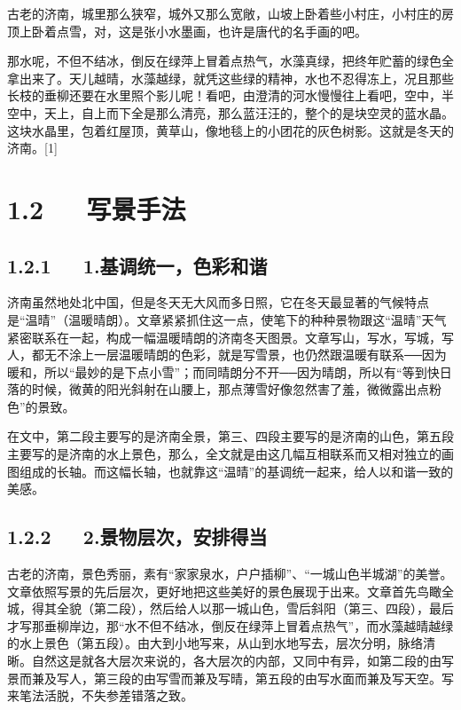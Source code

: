\documentclass[letterpaper,12pt,english]{sphinxmanual}
\begin{document}
古老的济南，城里那么狭窄，城外又那么宽敞，山坡上卧着些小村庄，小村庄的房顶上卧着点雪，对，这是张小水墨画，也许是唐代的名手画的吧。

那水呢，不但不结冰，倒反在绿萍上冒着点热气，水藻真绿，把终年贮蓄的绿色全拿出来了。天儿越晴，水藻越绿，就凭这些绿的精神，水也不忍得冻上，况且那些长枝的垂柳还要在水里照个影儿呢！看吧，由澄清的河水慢慢往上看吧，空中，半空中，天上，自上而下全是那么清亮，那么蓝汪汪的，整个的是块空灵的蓝水晶。这块水晶里，包着红屋顶，黄草山，像地毯上的小团花的灰色树影。这就是冬天的济南。{[}1{]}


\section{1.2   写景手法}
\label{\detokenize{p01_u6563_u6587/_u8001_u820d-_u6d4e_u5357_u7684_u51ac_u5929:id4}}

\subsection{1.2.1   1.基调统一，色彩和谐}
\label{\detokenize{p01_u6563_u6587/_u8001_u820d-_u6d4e_u5357_u7684_u51ac_u5929:id5}}
济南虽然地处北中国，但是冬天无大风而多日照，它在冬天最显著的气候特点是“温晴”（温暖晴朗）。文章紧紧抓住这一点，使笔下的种种景物跟这“温晴”天气紧密联系在一起，构成一幅温暖晴朗的济南冬天图景。文章写山，写水，写城，写人，都无不涂上一层温暖晴朗的色彩，就是写雪景，也仍然跟温暖有联系──因为暖和，所以“最妙的是下点小雪”；而同晴朗分不开──因为晴朗，所以有“等到快日落的时候，微黄的阳光斜射在山腰上，那点薄雪好像忽然害了羞，微微露出点粉色”的景致。

在文中，第二段主要写的是济南全景，第三、四段主要写的是济南的山色，第五段主要写的是济南的水上景色，那么，全文就是由这几幅互相联系而又相对独立的画图组成的长轴。而这幅长轴，也就靠这“温晴”的基调统一起来，给人以和谐一致的美感。


\subsection{1.2.2   2.景物层次，安排得当}
\label{\detokenize{p01_u6563_u6587/_u8001_u820d-_u6d4e_u5357_u7684_u51ac_u5929:id6}}
古老的济南，景色秀丽，素有“家家泉水，户户插柳”、“一城山色半城湖”的美誉。文章依照写景的先后层次，更好地把这些美好的景色展现于出来。文章首先鸟瞰全城，得其全貌（第二段），然后给人以那一城山色，雪后斜阳（第三、四段），最后才写那垂柳岸边，那“水不但不结冰，倒反在绿萍上冒着点热气”，而水藻越晴越绿的水上景色（第五段）。由大到小地写来，从山到水地写去，层次分明，脉络清晰。自然这是就各大层次来说的，各大层次的内部，又同中有异，如第二段的由写景而兼及写人，第三段的由写雪而兼及写晴，第五段的由写水面而兼及写天空。写来笔法活脱，不失参差错落之致。
\end{document}
